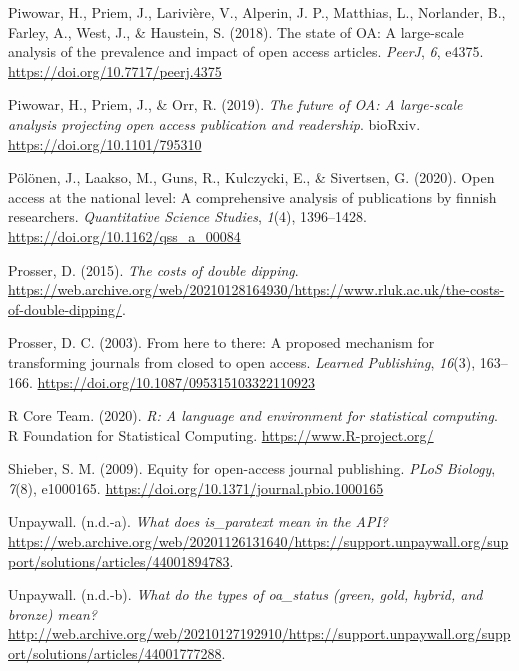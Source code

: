 \documentclass[a4paper,man,floatsintext,longtable,noextraspace,12pt]{apa6}
\newlength{\cslhangindent}
\newenvironment{cslreferences}%
  {\setlength{\parindent}{0pt}%
  \everypar{\setlength{\hangindent}{\cslhangindent}}\ignorespaces}%
  {\par}
\begin{document}
\begin{cslreferences}
\leavevmode\hypertarget{ref-Piwowar_2018}{}%
Piwowar, H., Priem, J., Larivière, V., Alperin, J. P., Matthias, L.,
Norlander, B., Farley, A., West, J., \& Haustein, S. (2018). The state
of OA: A large-scale analysis of the prevalence and impact of open
access articles. \emph{PeerJ}, \emph{6}, e4375.
\url{https://doi.org/10.7717/peerj.4375}

\leavevmode\hypertarget{ref-Piwowar_2019}{}%
Piwowar, H., Priem, J., \& Orr, R. (2019). \emph{The future of OA: A
large-scale analysis projecting open access publication and readership}.
bioRxiv. \url{https://doi.org/10.1101/795310}

\leavevmode\hypertarget{ref-P_l_nen_2020}{}%
Pölönen, J., Laakso, M., Guns, R., Kulczycki, E., \& Sivertsen, G.
(2020). Open access at the national level: A comprehensive analysis of
publications by finnish researchers. \emph{Quantitative Science
Studies}, \emph{1}(4), 1396--1428.
\url{https://doi.org/10.1162/qss_a_00084}

\leavevmode\hypertarget{ref-Prosser_2015}{}%
Prosser, D. (2015). \emph{The costs of double dipping}.
\url{https://web.archive.org/web/20210128164930/https://www.rluk.ac.uk/the-costs-of-double-dipping/}.

\leavevmode\hypertarget{ref-Prosser_2003}{}%
Prosser, D. C. (2003). From here to there: A proposed mechanism for
transforming journals from closed to open access. \emph{Learned
Publishing}, \emph{16}(3), 163--166.
\url{https://doi.org/10.1087/095315103322110923}

\leavevmode\hypertarget{ref-r}{}%
R Core Team. (2020). \emph{R: A language and environment for statistical
computing}. R Foundation for Statistical Computing.
\url{https://www.R-project.org/}

\leavevmode\hypertarget{ref-Shieber_2009}{}%
Shieber, S. M. (2009). Equity for open-access journal publishing.
\emph{PLoS Biology}, \emph{7}(8), e1000165.
\url{https://doi.org/10.1371/journal.pbio.1000165}

\leavevmode\hypertarget{ref-Unpaywall_para}{}%
Unpaywall. (n.d.-a). \emph{What does is\_paratext mean in the API?}
\url{https://web.archive.org/web/20201126131640/https://support.unpaywall.org/support/solutions/articles/44001894783}.

\leavevmode\hypertarget{ref-Unpaywall_types}{}%
Unpaywall. (n.d.-b). \emph{What do the types of oa\_status (green, gold,
hybrid, and bronze) mean?}
\url{http://web.archive.org/web/20210127192910/https://support.unpaywall.org/support/solutions/articles/44001777288}.


\end{cslreferences}
\end{document}

